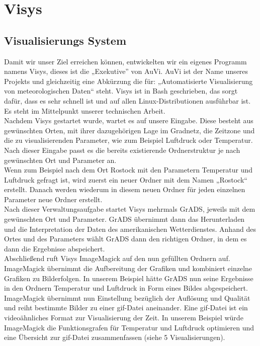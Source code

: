 \documentclass[a4paper,oneside,12pt,titlepage]{article}
\begin{document}
\newpage
\section{Visys}
\subsection{Visualisierungs System}
        Damit wir unser Ziel erreichen können, entwickelten wir ein eigenes Programm namens Visys, dieses ist die „Exekutive'' von AuVi. AuVi ist der Name unseres Projekts und gleichzeitig eine Abkürzung die für: „Automatisierte Visualisierung von meteorologischen Daten“ steht. Visys ist in Bash geschrieben, das sorgt dafür, dass es sehr schnell ist und auf allen Linux-Distributionen ausführbar ist. Es steht im Mittelpunkt unserer technischen Arbeit. \\Nachdem Visys gestartet wurde, wartet es auf unsere Eingabe. Diese besteht aus gewünschten Orten, mit ihrer dazugehörigen Lage im Gradnetz, die Zeitzone und die zu visualisierenden Parameter, wie zum Beispiel Luftdruck oder Temperatur. Nach dieser Eingabe passt es die bereits existierende Ordnerstruktur je nach gewünschten Ort und Parameter an. \\Wenn zum Beispiel nach dem Ort Rostock mit den Parametern Temperatur und Luftdruck gefragt ist, wird zuerst ein neuer Ordner mit dem Namen „Rostock“ erstellt. Danach werden wiederum in diesem neuen Ordner für jeden einzelnen Parameter neue Ordner erstellt.\\Nach dieser Verwaltungsaufgabe startet Visys mehrmals GrADS, jeweils mit dem gewünschten Ort und Parameter. GrADS übernimmt dann das Herunterladen und die Interpretation der Daten des amerikanischen Wetterdienstes. Anhand des Ortes und des Parameters wählt GrADS dann den richtigen Ordner, in dem es dann die Ergebnisse abspeichert.\\Abschließend ruft Visys ImageMagick auf den nun gefüllten Ordnern auf. ImageMagick übernimmt die Aufbereitung der Grafiken und kombiniert einzelne Grafiken zu Bilderfolgen. In unserem Beispiel hätte GrADS nun seine Ergebnisse in den Ordnern Temperatur und Luftdruck in Form eines Bildes abgespeichert. ImageMagick übernimmt nun Einstellung bezüglich der Auflösung und Qualität und reiht bestimmte Bilder zu einer gif-Datei aneinander. Eine gif-Datei ist ein videoähnliches Format zur Visualisierung der Zeit. In unserem Beispiel würde ImageMagick die Funktionsgrafen für Temperatur und Luftdruck optimieren und eine Übersicht zur gif-Datei zusammenfassen (siehe 5 Visualisierungen).
    
\end{document}
